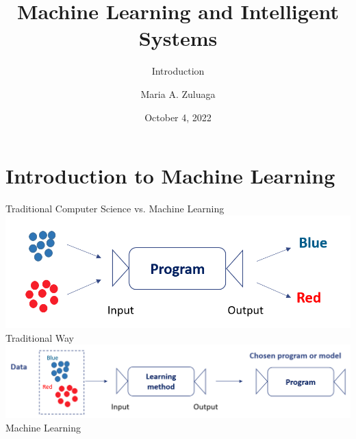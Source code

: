 \documentclass[aspectratio=169,10pt]{beamer}
\title{Machine Learning and Intelligent Systems}
\subtitle{Introduction}
\author{Maria A. Zuluaga}
\institute{EURECOM - Data Science Department}
\date{October 4, 2022}
\begin{document}
\maketitle





\section{Introduction to Machine Learning}

\begin{frame}[t]{Traditional Computer Science vs. Machine Learning}
	\centering
	\includegraphics[width=0.7\linewidth, clip]{images/pc_program}\\
	Traditional Way \\
	\pause
	\vspace{0.2cm}
	\includegraphics[width=0.85\linewidth, clip]{images/ml}\\
	Machine Learning
\end{frame}
\end{document}

